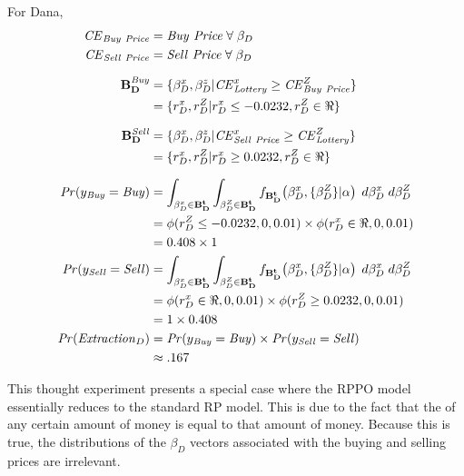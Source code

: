 \documentclass[../main.tex]{subfiles}
\begin{document}
\noindent For Dana,
\begin{align}
	\begin{split}
		{\ensuremath{\mathit{CE}}}_{\mathit{Buy\ Price}} &= \mathit{Buy\ Price} \;\forall\; \beta_D\\
		{\mathit{CE}}_{\mathit{Sell\ Price}} &= \mathit{Sell\ Price} \;\forall\; \beta_D\\[1.5ex]
		\mathbf{B_D^{\mathit{Buy}}} &= \{ \beta_D^x,\beta_D^z | {\mathit{CE}}_{\mathit{Lottery}}^x \geq {\ensuremath{\mathit{CE}}}_{\mathit{Buy\ Price}}^Z \}\\
		&= \{ r_D^x,r_D^Z | r_D^x \leq -0.0232, r_D^Z \in \Re\}\\[1.5ex]
		\mathbf{B_D^{\mathit{Sell}}} &= \{ \beta_D^x,\beta_D^z | {\mathit{CE}}_{\mathit{Sell\ Price}}^x \geq {\ensuremath{\mathit{CE}}}_{\mathit{Lottery}}^Z \}\\
		&= \{ r_D^x,r_D^Z | r_D^x \geq 0.0232, r_D^Z \in \Re\}\\[1.5ex]
		{\ensuremath{\mathit{Pr}}}(y_{\mathit{Buy}} = \mathit{Buy}) &= \int_{\beta_D^x \in \mathbf{B^t_D}}\int_{\beta_D^Z \in \mathbf{B^t_D}} f_{\mathbf{B^t_D}}\!\left(\beta_D^x,\{\beta_D^Z\}|\alpha\right) \;d\beta_D^x \; d\beta_D^Z\\
		&= \phi(r_D^Z \leq -0.0232,0,0.01) \times \phi(r_D^x \in \Re,0,0.01)\\
		&= 0.408 \times 1\\
		{\mathit{Pr}}(y_{\mathit{Sell}} = \mathit{Sell}) &= \int_{\beta_D^x \in \mathbf{B^t_D}}\int_{\beta_D^Z \in \mathbf{B^t_D}} f_{\mathbf{B^t_D}}\!\left(\beta_D^x,\{\beta_D^Z\}|\alpha\right) \;d\beta_D^x \; d\beta_D^Z\\
		&= \phi(r_D^x \in \Re,0,0.01) \times \phi(r_D^Z \geq 0.0232,0,0.01)\\
		&= 1 \times 0.408\\
	{\mathit{Pr}}(\mathit{Extraction}_D) &= {\mathit{Pr}}(y_{\mathit{Buy}} = \mathit{Buy}) \times {\ensuremath{\mathit{Pr}}}(y_{\mathit{Sell}} = \mathit{Sell})\\
	&\approx .167
	\end{split}
\end{align}

This thought experiment presents a special case where the RPPO model essentially reduces to the standard RP model.
This is due to the fact that the {\CE} of any certain amount of money is equal to that amount of money.
Because this is true, the distributions of the $\beta_D$ vectors associated with the buying and selling prices are irrelevant.{\footnotemark}

\addtocounter{footnote}{-1}
\end{document}
